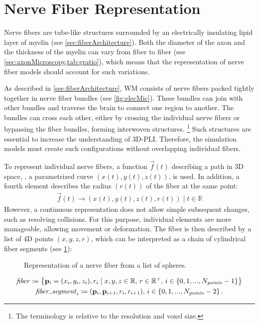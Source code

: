 \section{Nerve Fiber Representation}
\label{sec:nerve_fiber_representation}
%
Nerve fibers are tube-like structures surrounded by an electrically insulating lipid layer of myelin (see \cref{sec:fiberArchitecture}).
Both the diameter of the axon and the thickness of the myelin can vary from fiber to fiber (see \cref{sec:axonMicroscopy,tab:gratio}), which
means that the representation of nerve fiber models should account for such variations.
\par
%
As described in \cref{sec:fiberArchitecture}, \ac{WM} consists of nerve fibers packed tightly together in nerve fiber bundles (see \cref{fig:elecMic}).
These bundles can join with other bundles and traverse the brain to connect one region to another.
The bundles can cross each other, either by crossing the individual nerve fibers or bypassing the fiber bundles, forming interwoven structures.
\footnote{The terminology  is relative to the resolution and voxel size.}
Such structures are essential to increase the understanding of \ac{3D-PLI}.
Therefore, the simulation models must create such configurations without overlapping individual fibers.
\par
%
To represent individual nerve fibers, a function $\vec{f}(t)$ describing a path in 3D space, \ie{}, a parametrized curve $(x(t), y(t), z(t))$, is used.
In addition, a fourth element describes the radius $(r(t))$ of the fiber at the same point:
% 
\begin{align}
\vec{f}(t) \rightarrow (x(t), y(t), z(t), r(t)) \; | \; t \in \mathbb{R}
\end{align}
% 
However, a continuous representation does not allow simple subsequent changes, such as resolving collisions.
For this purpose, individual elements are more manageable, allowing movement or deformation.
The fiber is then described by a list of 4D points $(x,y,z,r)$, which can be interpreted as a chain of cylindrical fiber segments (see \cref{fig:fiberReb}):
%
\begin{figure}[!t]
    \setlength{\tikzwidth}{0.85\textwidth}
    \centering
	\caption[]{Representation of a nerve fiber from a list of spheres.}
	\label{fig:fiberReb}
\end{figure}
% 
\begin{align}
\begin{gathered}
\mathit{fiber} \coloneqq \left\{ \vec{p}_i=(x_i,y_i,z_i), r_i \mid x,y,z \in \mathbb{R}, \, r \in \mathbb{R^+}, \, i \in \{0,1,...,N_{\mathit{points}}-1\}\right\} \\
\mathit{fiber\tum{}segment}_i \coloneqq (\vec{p}_i, \vec{p}_{i+1}, r_i, r_{i+1}), \, i \in \{0,1,...,N_{\mathit{points}}-2\} \, .
\end{gathered}
\end{align}
